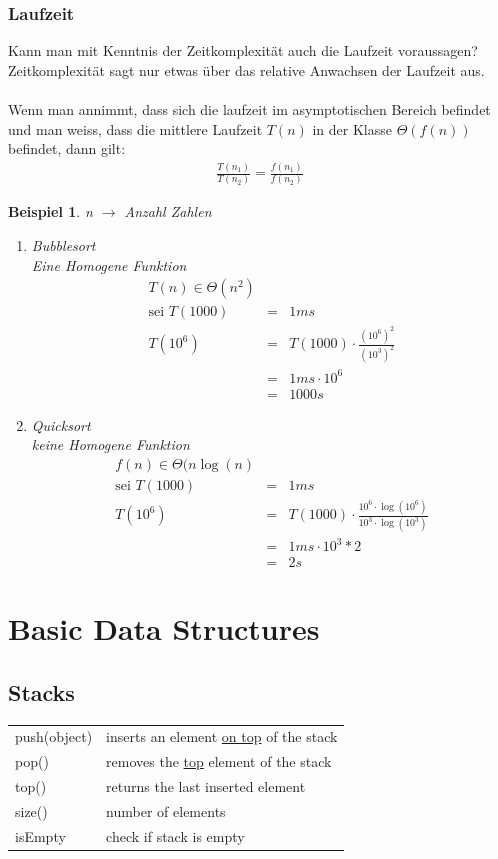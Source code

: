 \documentclass[a4paper,10pt]{report}
\newtheorem{myexample}{Beispiel}
\begin{document}
 \subsection{Laufzeit}
 Kann man mit Kenntnis der Zeitkomplexität auch die Laufzeit voraussagen?\\
 Zeitkomplexität sagt nur etwas über das relative Anwachsen der Laufzeit aus.\\
 \\
 Wenn man annimmt, dass sich die laufzeit im asymptotischen Bereich befindet und man weiss, dass die mittlere Laufzeit $T(n)$ in der Klasse $\Theta(f(n))$ befindet, dann gilt:
 \begin{eqnarray*}
 	\frac{T(n_1)}{T(n_2)} = \frac{f(n_1)}{f(n_2)}
 \end{eqnarray*}
 \begin{myexample}
 	n $\to$ Anzahl Zahlen
 	\begin{enumerate}
 		\item{Bubblesort}\\
 		Eine Homogene Funktion
 		\begin{eqnarray*}
 			T(n) \in \Theta(n^2)\\
 			\text{sei } T(1000) &=& 1ms\\
 			T(10^6) &=& T(1000) \cdot \frac{(10^6)^2}{(10^3)^2}\\
 			&=& 1ms \cdot 10^6\\
 			&=& 1000s 
 		\end{eqnarray*}
 		\item{Quicksort}\\
 		keine Homogene Funktion
 		\begin{eqnarray*}
 			f(n) \in \Theta(n\log(n)\\
 			\text{sei } T(1000) &=& 1ms\\
 			T(10^6) &=& T(1000) \cdot \frac{10^6\cdot\log(10^6)}{10^3\cdot\log(10^3)}\\
 			&=& 1ms \cdot 10^3 * 2\\
 			&=& 2s 
 		\end{eqnarray*}
 	\end{enumerate}
 \end{myexample}
 \chapter{Basic Data Structures}
 \section{Stacks}
 \begin{tabularx}{\textwidth}{lX}
 	push(object) & inserts an element \underline{on top} of the stack\\
 	pop() & removes the \underline{top} element of the stack\\
 	top() & returns the last inserted element\\
 	size() & number of elements\\
 	isEmpty & check if stack is empty  
 \end{tabularx}
\end{document}
